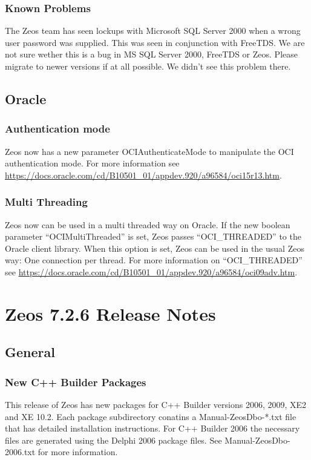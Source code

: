 \documentclass[a4paper,12pt,oneside]{book}
\begin{document}
\subsection{Known Problems}

The Zeos team has seen lockups with Microsoft SQL Server 2000 when a wrong user password was supplied.
This was seen in conjunction with FreeTDS.
We are not sure wether this is a bug in MS SQL Server 2000, FreeTDS or Zeos.
Please migrate to newer versions if at all possible.
We didn't see this problem there.

\section{Oracle}

\subsection{Authentication mode}

Zeos now has a new parameter OCIAuthenticateMode to manipulate the OCI authentication mode.
For more information see \url{https://docs.oracle.com/cd/B10501_01/appdev.920/a96584/oci15r13.htm}.

\subsection{Multi Threading}

Zeos now can be used in a multi threaded way on Oracle.
If the new boolean parameter "`OCIMultiThreaded"' is set, Zeos passes "`OCI\_THREADED"' to the Oracle client library.
When this option is set, Zeos can be used in the usual Zeos way: One connection per thread.
For more information on "`OCI\_THREADED"' see \url{https://docs.oracle.com/cd/B10501_01/appdev.920/a96584/oci09adv.htm}.

\chapter{Zeos 7.2.6 Release Notes}

\section{General}
\label{sec:Rev6_General}

\subsection{New C++ Builder Packages}
\label{sec:Rev6_General_CppBuilderPackages}
This release of Zeos has new packages for C++ Builder versions 2006, 2009, XE2 and XE 10.2.
Each package subdirectory conatins a Manual-ZeosDbo-*.txt file that has detailed installation instructions.
For C++ Builder 2006 the necessary files are generated using the Delphi 2006 package files.
See Manual-ZeosDbo-2006.txt for more information.
\end{document}
